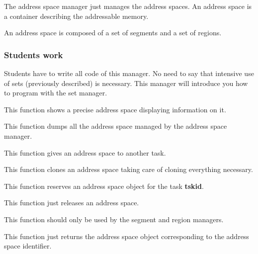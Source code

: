 The address space manager just  manages the address spaces. An address
space is a container describing the addressable memory.

An address space is composed of a set of segments and a set of regions.

\subsubsection{Students work}

Students have to  write all code of this manager. No  need to say that
intensive  use  of  sets  (previously described)  is  necessary.  This
manager will introduce you how to program with the set manager.


This function shows a precise address space displaying information
on it.


This function dumps all the address space managed by the address
space manager.


This function gives an address space to another task.


This function clones an address space taking care of cloning everything
necessary.


This function reserves an address space object for the task \textbf{tskid}.


This function just releases an address space.


This function should only be used by the segment and region managers.

This function just returns the address space object corresponding to
the address space identifier.

